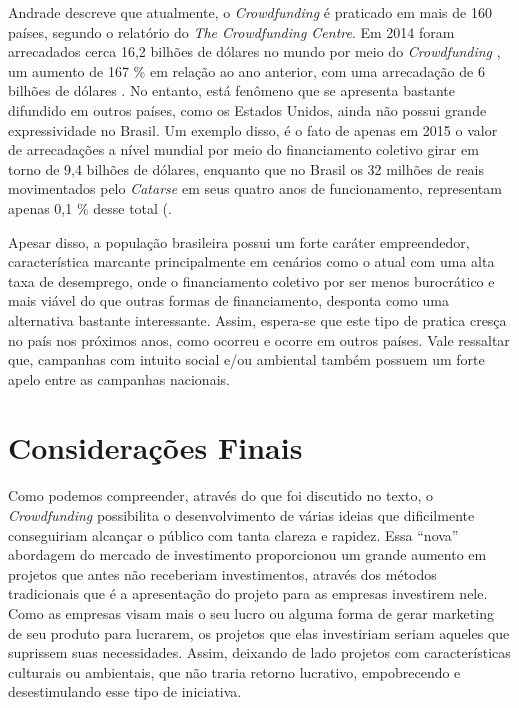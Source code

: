 \documentclass{classe_cn}                 %
\begin{document}
Andrade \cite{ANDRADE:2017} descreve que atualmente, o \textit{Crowdfunding}  é praticado em mais de 160 países, segundo o relatório do \textit{The Crowdfunding  Centre}. Em 2014 foram arrecadados cerca 16,2 bilhões de dólares no mundo por meio do \textit{Crowdfunding} , um aumento de 167 \% em relação ao ano anterior, com uma arrecadação de 6 bilhões de dólares \cite{PASCOAL:2017}. No entanto, está fenômeno que se apresenta bastante difundido em outros países, como os Estados Unidos, ainda não possui grande expressividade no Brasil. Um exemplo disso, é o fato de apenas em 2015 o valor de arrecadações a nível mundial por meio do financiamento coletivo girar em torno de 9,4 bilhões de dólares, enquanto que no Brasil os 32 milhões de reais movimentados pelo \textit{Catarse} em seus quatro anos de funcionamento, representam apenas 0,1 \% desse total (\cite{ALVES:2017}.

Apesar disso, a população brasileira possui um forte caráter empreendedor, característica marcante principalmente em cenários como o atual com uma alta taxa de desemprego, onde o financiamento coletivo por ser menos burocrático e mais viável do que outras formas de financiamento, desponta como uma alternativa bastante interessante. Assim, espera-se que este tipo de pratica cresça no país nos próximos anos, como ocorreu e ocorre em outros países. Vale ressaltar que, campanhas com intuito social e/ou ambiental também possuem um forte apelo entre as campanhas nacionais.

\section{Considerações Finais}

Como podemos compreender, através do que foi discutido no texto, o \textit{Crowdfunding}  possibilita o desenvolvimento de várias ideias que dificilmente conseguiriam alcançar o público com tanta clareza e rapidez. Essa “nova” abordagem do mercado de investimento proporcionou um grande aumento em projetos que antes não receberiam investimentos, através dos métodos tradicionais que é a apresentação do projeto para as empresas investirem nele. Como as empresas visam mais o seu lucro ou alguma forma de gerar marketing de seu produto para lucrarem, os projetos que elas investiriam seriam aqueles que suprissem suas necessidades. Assim, deixando de lado projetos com características culturais ou ambientais, que não traria retorno lucrativo, empobrecendo e desestimulando esse tipo de iniciativa.
\end{document}

